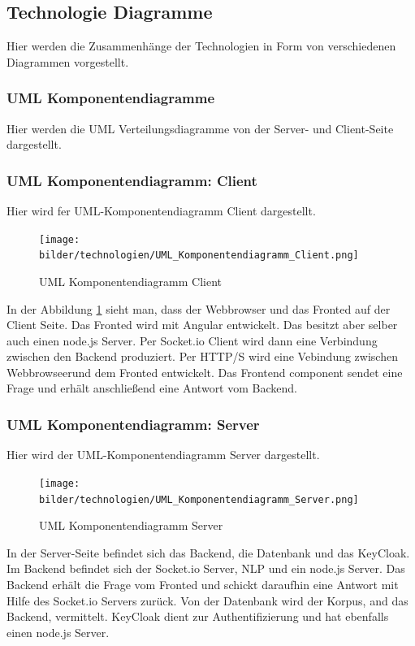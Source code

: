 \newpage
\subsection{Technologie Diagramme}
 Hier werden die Zusammenhänge der Technologien in Form von verschiedenen Diagrammen vorgestellt.

\subsubsection{UML Komponentendiagramme}
Hier werden die UML Verteilungsdiagramme von der Server- und Client-Seite dargestellt.

\subsubsection{UML Komponentendiagramm: Client}
Hier wird fer UML-Komponentendiagramm Client dargestellt.

\begin{figure}[H]
    \centering
    \texttt{[image: bilder/technologien/UML\_Komponentendiagramm\_Client.png]}
    \caption{UML Komponentendiagramm Client}
    \label{fig:UML_Komponentendiagramm_Client}
    \end{figure}
\noindent In der Abbildung \ref{fig:UML_Komponentendiagramm_Client} sieht man, dass der Webbrowser und das Fronted auf der Client Seite.
Das Fronted wird mit Angular entwickelt. Das besitzt aber selber auch einen node.js Server.
Per Socket.io Client wird dann eine Verbindung zwischen den Backend produziert. Per HTTP/S
wird eine Vebindung zwischen Webbrowseerund dem Fronted entwickelt. Das Frontend component 
sendet eine Frage und erhält anschließend eine Antwort vom Backend.   

\newpage

\subsubsection{UML Komponentendiagramm: Server}
Hier wird der UML-Komponentendiagramm Server dargestellt.

\begin{figure}[H]
    \centering
    \texttt{[image: bilder/technologien/UML\_Komponentendiagramm\_Server.png]}
    \caption{UML Komponentendiagramm Server}
    \label{fig:UML_Komponentendiagramm_Server}
    \end{figure}
\noindent In der Server-Seite befindet sich das Backend, die Datenbank und das KeyCloak.
Im Backend befindet sich der Socket.io Server, NLP und ein node.js Server.
Das Backend erhält die Frage vom Fronted und schickt daraufhin eine Antwort mit Hilfe des Socket.io Servers zurück.
Von der Datenbank wird der Korpus, and das Backend, vermittelt. KeyCloak dient zur Authentifizierung und
hat ebenfalls einen node.js Server. 

